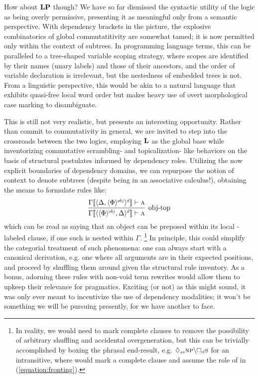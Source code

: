 How about $\textbf{LP}$ though?
We have so far dismissed the syntactic utility of the logic as being overly permissive, presenting it as meaningful only from a semantic perspective.
With dependency brackets in the picture, the explosive combinatorics of global commutatitivity are somewhat tamed; it is now permitted only within the context of subtrees.
In programming language terms, this can be paralleled to a tree-shaped variable scoping strategy, where scopes are identified by their names (unary labels) and those of their ancestors, and the order of variable declaration is irrelevant, but the nestedness of embedded trees is not.
From a linguistic perspective, this would be akin to a natural language that exhibits quasi-free local word order but makes heavy use of overt morphological case marking to disambiguate.

This is still not very realistic, but presents an interesting opportunity.
Rather than commit to commutativity in general, we are invited to step into the crossroads between the two logics, employing $\textbf{L}$ as the global base while inventorizing commutative scrambling- and topicalization- like behaviors on the basis of structural postulates informed by dependency roles.
Utilizing the now explicit boundaries of dependency domains, we can repurpose the notion of context to denote subtrees (despite being in an associative calculus!), obtaining the means to formulate rules like:
\begin{equation}\label{equation:fronting}
	\infer[\text{obj-top}]
		{\Gamma\ctx{\dbra{\dbra{\Phi}{obj},\Delta}{d}} \vdash \prop{a}}
		{\Gamma\ctx{\dbra{\Delta, \dbra{\Phi}{obj}}{d}} \vdash \prop{a}}
\end{equation}
which can be read as saying that an object can be preposed within its local -labeled clause, if one such is nested within $\Gamma$.%
	\footnote{In reality, we would need to mark complete clauses to remove the possibility of arbitrary shuffling and accidental overgeneration, but this can be trivially accomplished by boxing the phrasal end-result, e.g. $\ddia{su}\np[s]\divleft\dbox{cl}{\s[s]}$ for an intransitive, where  would mark a complete clause and assume the role of  in (\ref{equation:fronting}).}
In principle, this could simplify the categorial treatment of such phenomena: one can always start with a canonical derivation, e.g. one where all arguments are in their expected positions, and proceed by shuffling them around given the structural rule inventory.
As a bonus, adorning these rules with non-void term rewrites would allow them to upkeep their relevance for pragmatics.
Exciting (or not) as this might sound, it was only ever meant to incentivize the use of dependency modalities; it won't be something we will be pursuing presently, for we have another  to face.

